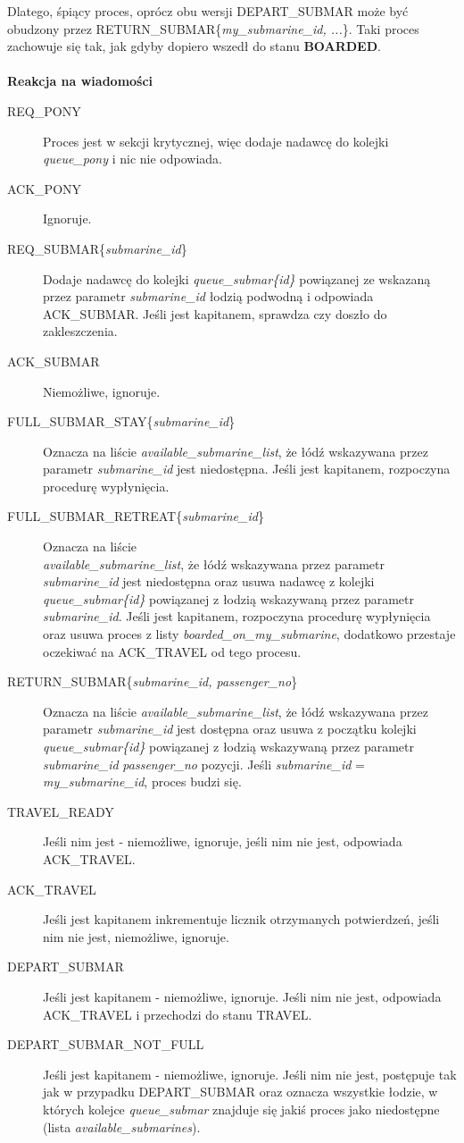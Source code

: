 \documentclass[a4paper]{article}
\begin{document}
Dlatego, śpiący proces, oprócz obu wersji DEPART\_SUBMAR może być obudzony przez RETURN\_SUBMAR\{\textit{my\_submarine\_id, ...}\}. Taki proces zachowuje się tak, jak gdyby dopiero wszedł do stanu \textbf{BOARDED}.
\\
\\
\textbf{Reakcja na wiadomości}
\begin{description}
    \item [REQ\_PONY] Proces jest w sekcji krytycznej, więc dodaje nadawcę do kolejki \textit{queue\_pony} i nic nie odpowiada.
    \item [ACK\_PONY] Ignoruje.
    \item [REQ\_SUBMAR\{\textit{submarine\_id}\}] Dodaje nadawcę do kolejki \textit{queue\_submar\{id\}} powiązanej ze wskazaną przez parametr \textit{submarine\_id} łodzią podwodną i odpowiada ACK\_SUBMAR. Jeśli jest kapitanem, sprawdza czy doszło do zakleszczenia.
    \item [ACK\_SUBMAR] Niemożliwe, ignoruje.
    \item [FULL\_SUBMAR\_STAY\{\textit{submarine\_id}\}] Oznacza na liście \textit{available\_submarine\_list}, że łódź wskazywana przez parametr \textit{submarine\_id} jest niedostępna. Jeśli jest kapitanem, rozpoczyna procedurę wypłynięcia.
    \item [FULL\_SUBMAR\_RETREAT\{\textit{submarine\_id}\}] Oznacza na liście\\
     \textit{available\_submarine\_list}, że łódź wskazywana przez parametr \textit{submarine\_id} jest niedostępna oraz usuwa nadawcę z kolejki \textit{queue\_submar\{id\}} powiązanej z łodzią wskazywaną przez parametr \textit{submarine\_id}. Jeśli jest kapitanem, rozpoczyna procedurę wypłynięcia oraz usuwa proces z listy \textit{boarded\_on\_my\_submarine}, dodatkowo przestaje oczekiwać na ACK\_TRAVEL od tego procesu.
    \item [RETURN\_SUBMAR\{\textit{submarine\_id, passenger\_no}\}] Oznacza na liście \textit{available\_submarine\_list}, że łódź wskazywana przez parametr \textit{submarine\_id} jest dostępna
    oraz usuwa z początku kolejki \textit{queue\_submar\{id\}} powiązanej z łodzią wskazywaną przez parametr \textit{submarine\_id} \textit{passenger\_no} pozycji. Jeśli \textit{submarine\_id} = \textit{my\_submarine\_id}, proces budzi się.
    \item [TRAVEL\_READY] Jeśli nim jest - niemożliwe, ignoruje, jeśli nim nie jest, odpowiada ACK\_TRAVEL.
    \item [ACK\_TRAVEL] Jeśli jest kapitanem inkrementuje licznik otrzymanych potwierdzeń, jeśli nim nie jest, niemożliwe, ignoruje.
    \item [DEPART\_SUBMAR] Jeśli jest kapitanem - niemożliwe, ignoruje. Jeśli nim nie jest, odpowiada ACK\_TRAVEL i przechodzi do stanu TRAVEL.
    \item [DEPART\_SUBMAR\_NOT\_FULL] Jeśli jest kapitanem - niemożliwe, ignoruje. Jeśli nim nie jest, postępuje tak jak w przypadku DEPART\_SUBMAR oraz oznacza wszystkie łodzie, w których kolejce \textit{queue\_submar} znajduje się jakiś proces jako niedostępne (lista \textit{available\_submarines}).
\end{description}
\end{document}

